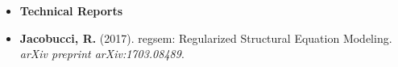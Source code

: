 \documentclass[letterpaper,10pt]{article}
\begin{document}
\begin{itemize}
%
%
\vspace{3mm}
%
\item {\textbf{\large{Technical Reports}}}
\item[] \textbf{Jacobucci, R.} (2017). regsem: Regularized Structural Equation Modeling. \emph{arXiv preprint arXiv:1703.08489}.
\vspace{3mm}
%
%
\begin{comment}
\item {\textbf{\large{Manuscripts Under Review}}}
%
\item[] \textbf{Jacobucci, R.}. (under review). Are decision trees reliable enough for psychological research?
%
\item[] Ammerman, B.A., \textbf{Jacobucci, R.}, Turner, B. J., Dixon-Gordon, K., \& McCloskey, M.S. (under review). Quantifying the importance of lifetime frequency versus number of methods used in the consideration of NSSI severity.
%
\item{\textbf{\large{Manuscripts in Preparation}}} 
%
\item[] Grimm, K. J., \& \textbf{Jacobucci, R.}. (in preparation). Reliable trees: Reliability informed recursive partitioning for psychological data. 
\end{comment}
%
%
%

%
%
%


\end{itemize} 
\end{document}
